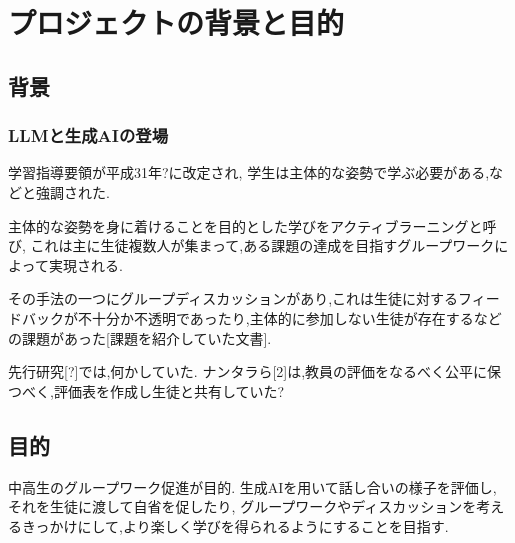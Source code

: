 \chapter{プロジェクトの背景と目的}

\section{背景}
\subsection{LLMと生成AIの登場}
学習指導要領が平成31年?に改定され,
学生は主体的な姿勢で学ぶ必要がある,などと強調された.

主体的な姿勢を身に着けることを目的とした学びをアクティブラーニングと呼び,
これは主に生徒複数人が集まって,ある課題の達成を目指すグループワークによって実現される.

その手法の一つにグループディスカッションがあり,これは生徒に対するフィードバックが不十分か不透明であったり,主体的に参加しない生徒が存在するなどの課題があった[課題を紹介していた文書].

先行研究[?]では,何かしていた.
ナンタラら[2]は,教員の評価をなるべく公平に保つべく,評価表を作成し生徒と共有していた?


\section{目的}
中高生のグループワーク促進が目的.
生成AIを用いて話し合いの様子を評価し,
それを生徒に渡して自省を促したり,
グループワークやディスカッションを考えるきっかけにして,より楽しく学びを得られるようにすることを目指す.

